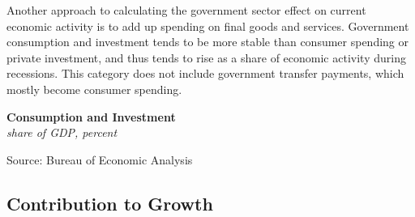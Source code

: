 \documentclass{report}
\makeatletter
\newcommand{\tbllink}[1]{\href{https://raw.githubusercontent.com/bdecon/US-chartbook/master/chartbook/data/#1}{\faTable}}
\newcommand*\short[1]{\expandafter\@gobbletwo\number\numexpr#1\relax}
\newcommand{\stdnode}[3]{\node[below, align=left, shift=({#1,#2})]{#3};}
\newcommand{\shdateaxisticks}{
		date coordinates in=x, axis line style={draw=none},
		xmax={2023-11-30},
		max space between ticks=40,	    
		xtick={{1990-01-01}, {1995-01-01}, {2000-01-01}, 
			{2005-01-01}, {2010-01-01}, {2015-01-01}, {2020-01-01}},
		minor xtick={},
		enlarge y limits={0.06}, enlarge x limits={0.01},
		xticklabel style={align=center, yshift=-2pt}, tick label style={inner sep=0pt},
		}
\newcommand{\bbar}[2]{extra #1 ticks = {{#2}}, extra #1 tick labels = ,
		extra #1 tick style = {grid=major, grid style={thick, black!25}},}
\newcommand{\stdline}[4]{\addplot[very thick, no markers, color=#1] 
		table [x=#2, y=#3, col sep=comma] {#4};	}
\newcommand{\rbars}{
		\fill[color=black!10] (axis cs:{1990-07-01},\pgfkeysvalueof{/pgfplots/ymin}) rectangle 
			(axis cs:{1991-03-01}, \pgfkeysvalueof{/pgfplots/ymax});
		\fill[color=black!10] (axis cs:{2007-12-01},\pgfkeysvalueof{/pgfplots/ymin}) rectangle 
			(axis cs:{2009-07-01}, \pgfkeysvalueof{/pgfplots/ymax});
		\fill[color=black!10] (axis cs:{2001-03-01},\pgfkeysvalueof{/pgfplots/ymin}) rectangle 
			(axis cs:{2001-11-01}, \pgfkeysvalueof{/pgfplots/ymax});
		\fill[color=black!10] (axis cs:{2020-02-01},\pgfkeysvalueof{/pgfplots/ymin}) rectangle 
			(axis cs:{2020-05-01}, \pgfkeysvalueof{/pgfplots/ymax});}
\makeatother
\begin{document}
{\begin{minipage}{0.76\textwidth}
\small Another approach to calculating the government sector effect on current economic activity is to add up spending on final goods and services. Government consumption and investment tends to be more stable than consumer spending or private investment, and thus tends to rise as a share of economic activity during recessions. This category does not include government transfer payments, which mostly become consumer spending.
\end{minipage}
\vspace{1mm}

\begin{minipage}{0.38\textwidth}
\normalsize \textbf{Consumption and Investment}\\
\footnotesize{\textit{share of GDP, percent}}
\vspace{3.7cm}

\hspace{2mm} 

\footnotesize{Source: Bureau of Economic Analysis} \hfill \tbllink{govci.csv}
\end{minipage}\hspace{5mm}
\begin{minipage}{0.34\textwidth}
\small 
\end{minipage}
\newpage
\hypertarget{govco}{\label{govco}}  
\begin{minipage}{0.76\textwidth}   
\subsection*{Contribution to Growth}
\small   
\vspace{2mm}


\end{minipage}}
\end{document}
